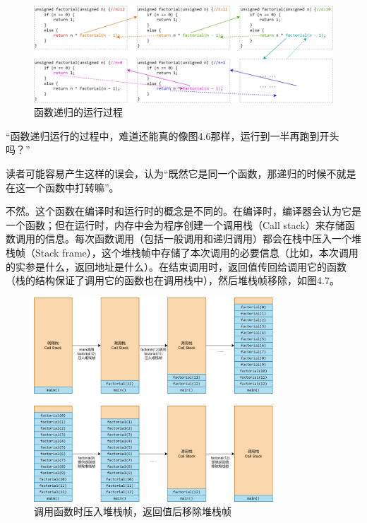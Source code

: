 \begin{figure}[htbp]
    \centering
    \includegraphics[width=\textwidth]{../images/generalized_parts/04_the_process_of_recursion.png}
    \caption{\lstinline@factorial@ 函数递归的运行过程}
\end{figure}
{\kaishu ``函数递归运行的过程中，难道还能真的像图4.6那样，运行到一半再跑到开头吗？''}\par
读者可能容易产生这样的误会，认为``既然它是同一个函数，那递归的时候不就是在这一个函数中打转嘛''。\par
不然。这个函数在编译时和运行时的概念是不同的。在编译时，编译器会认为它是一个函数；但在运行时，内存中会为程序创建一个调用栈（Call stack）来存储函数调用的信息。每次函数调用（包括一般调用和递归调用）都会在栈中压入一个堆栈帧（Stack frame），这个堆栈帧中存储了本次调用的必要信息（比如，本次调用的实参是什么，返回地址是什么）。在结束调用时，返回值传回给调用它的函数（栈的结构保证了调用它的函数也在调用栈中），然后堆栈帧移除，如图4.7。\par
\begin{figure}[htbp]
    \centering
    \includegraphics[width=0.8\textwidth]{.//images/generalized_parts/04_call_stack_structure.png}
    \caption{调用函数时压入堆栈帧，返回值后移除堆栈帧}    
\end{figure}
